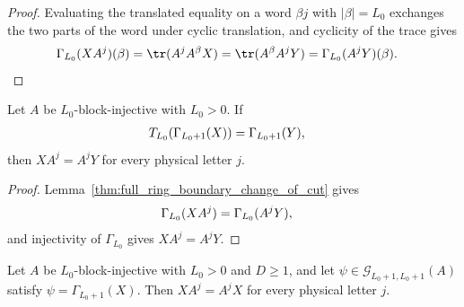 \begin{proof}
    \leanok
    Evaluating the translated equality on a word $\beta j$ with $|\beta|=L_0$
    exchanges the two parts of the word under cyclic translation, and cyclicity
    of the trace gives
    \begin{align}
        \Gamma_{L_0}(XA^j)(\beta)
         & =\tr(A^jA^\beta X)
        =\tr(A^\beta A^jY)
        =\Gamma_{L_0}(A^jY)(\beta).
        \notag
    \end{align}
\end{proof}

\begin{lemma}
    \label{thm:full_ring_boundary_intertwines_step}
    \leanok
    Let $A$ be $L_0$-block-injective with $L_0>0$. If
    \begin{align}
        T_{L_0}\!\left(\Gamma_{L_0+1}(X)\right)
         & =\Gamma_{L_0+1}(Y),
        \notag
    \end{align}
    then $XA^j=A^jY$ for every physical letter $j$.
\end{lemma}

\begin{proof}
    \leanok
    Lemma~\ref{thm:full_ring_boundary_change_of_cut} gives
    \begin{align}
        \Gamma_{L_0}(XA^j)
         & =\Gamma_{L_0}(A^jY),
        \notag
    \end{align}
    and injectivity of $\Gamma_{L_0}$ gives $XA^j=A^jY$.
\end{proof}

\begin{lemma}
    \label{thm:full_ring_boundary_intertwines}
    \leanok
    Let $A$ be $L_0$-block-injective with $L_0>0$ and $D\ge1$, and let
    $\psi\in\mathcal G_{L_0+1,L_0+1}(A)$ satisfy
    $\psi=\Gamma_{L_0+1}(X)$. Then $XA^j=A^jX$ for every physical letter $j$.
\end{lemma}

